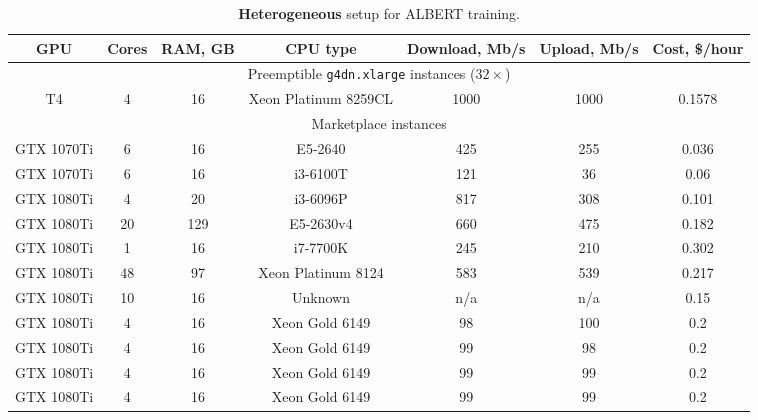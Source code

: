 \begin{table*}[ht!]
\centering
\caption{\textbf{Heterogeneous} setup for ALBERT training.}
\label{fig:tab_setup}
\small
\setlength{\tabcolsep}{2pt}
\hspace{7pt}\begin{tabular}{@{}ccccccc@{}}
\toprule
GPU           & Cores & RAM, GB & CPU type                       & Download, Mb/s & Upload, Mb/s &
Cost, \$/hour \\ 
\midrule
\multicolumn{7}{c}{Preemptible \texttt{g4dn.xlarge} instances ($32{\times}$)} \\
\midrule
T4            & 4         & 16     & Xeon Platinum 8259CL           & 1000          & 1000        & 0.1578         \\

\midrule
\multicolumn{7}{c}{Marketplace instances} \\    
\midrule
GTX 1070Ti    & 6         & 16     & E5-2640                        & 425           & 255         & 0.036         \\
GTX 1070Ti    & 6         & 16     & i3-6100T                       & 121           & 36          & 0.06          \\
GTX 1080Ti    & 4         & 20     & i3-6096P                       & 817           & 308         & 0.101         \\
GTX 1080Ti    & 20        & 129    & E5-2630v4                      & 660           & 475         & 0.182         \\
GTX 1080Ti    & 1         & 16     & i7-7700K                       & 245           & 210         & 0.302         \\
GTX 1080Ti    & 48        & 97     & Xeon Platinum 8124             & 583           & 539         & 0.217         \\
GTX 1080Ti    & 10        & 16     & Unknown                        & n/a           & n/a           & 0.15          \\
GTX 1080Ti    & 4         & 16     & Xeon Gold 6149                 & 98            & 100         & 0.2           \\ %
GTX 1080Ti    & 4         & 16     & Xeon Gold 6149                 & 99            & 98          & 0.2           \\ %
GTX 1080Ti    & 4         & 16     & Xeon Gold 6149                 & 99            & 99          & 0.2           \\ %
GTX 1080Ti    & 4         & 16     & Xeon Gold 6149                 & 99            & 99          & 0.2           \\ %

\end{tabular}
\end{table*}
